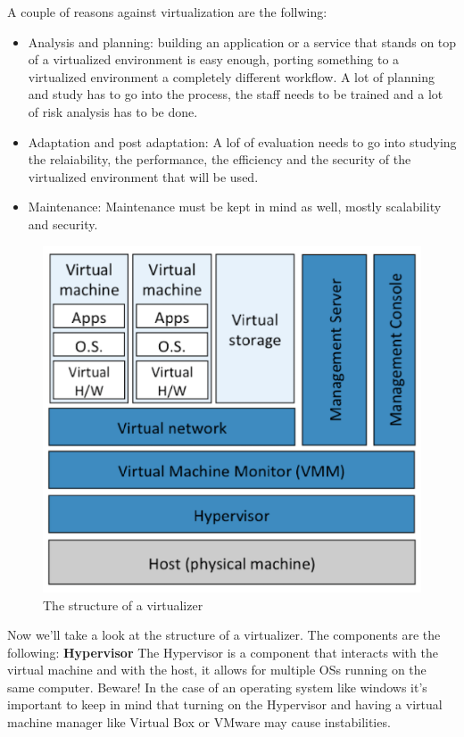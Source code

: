A couple of reasons against virtualization are the follwing:
\begin{itemize}
    \item Analysis and planning: building an application or a service that stands on top of a virtualized environment is easy enough, porting something to a virtualized environment a completely different workflow. A lot of planning and study has to go into the process, the staff needs to be trained and a lot of risk analysis has to be done.
    \item Adaptation and post adaptation: A lof of evaluation needs to go into studying the relaiability, the performance, the efficiency and the security of the virtualized environment that will be used.
    \item Maintenance: Maintenance must be kept in mind as well, mostly scalability and security.
\end{itemize}
\begin{figure}
    \centering
    \includegraphics[scale=0.4]{./Images/virtualization_components.png}
    \caption{The structure of a virtualizer}
\end{figure}
Now we'll take a look at the structure of a virtualizer. \n
The components are the following: \n
\smallSpace
\textbf{Hypervisor} \n
The Hypervisor is a component that interacts with the virtual machine and with the host, it allows for multiple OSs running on the same computer. Beware! In the case of an operating system like windows it's important to keep in mind that turning on the Hypervisor and having a virtual machine manager like Virtual Box or VMware may cause instabilities. \n
